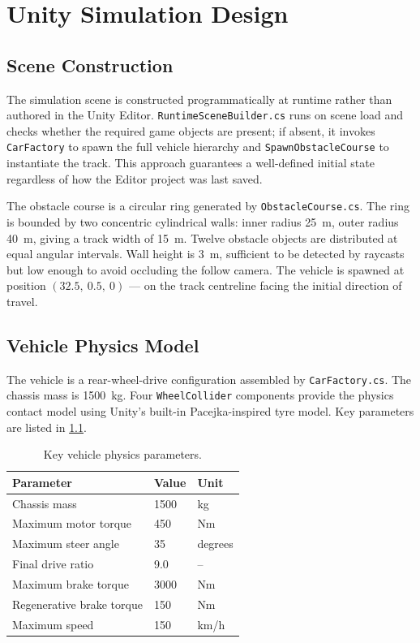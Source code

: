 \chapter{Unity Simulation Design}\label{ch:unity}
\thispagestyle{pagestyle}

\section{Scene Construction}
\label{sec:scene}

The simulation scene is constructed programmatically at runtime rather
than authored in the Unity Editor. \texttt{RuntimeSceneBuilder.cs} runs
on scene load and checks whether the required game objects are present;
if absent, it invokes \texttt{CarFactory} to spawn the full vehicle
hierarchy and \texttt{SpawnObstacleCourse} to instantiate the track. This
approach guarantees a well-defined initial state regardless of how the
Editor project was last saved.

The obstacle course is a circular ring generated by
\texttt{ObstacleCourse.cs}. The ring is bounded by two concentric
cylindrical walls: inner radius 25~m, outer radius 40~m, giving a track
width of 15~m. Twelve obstacle objects are distributed at equal angular
intervals. Wall height is 3~m, sufficient to be detected by raycasts but
low enough to avoid occluding the follow camera. The vehicle is spawned
at position $(32.5,\ 0.5,\ 0)$ --- on the track centreline facing the
initial direction of travel.

\section{Vehicle Physics Model}
\label{sec:vehicle-physics}

The vehicle is a rear-wheel-drive configuration assembled by
\texttt{CarFactory.cs}. The chassis mass is 1500~kg. Four
\texttt{WheelCollider} components provide the physics contact model using
Unity's \cite{UnityManual2022} built-in Pacejka-inspired tyre model.
Key parameters are listed in \cref{table:vehicle-params}.

\begin{table}[H]
\caption{Key vehicle physics parameters.}
\label{table:vehicle-params}
\begin{tabular}{|p{5cm}|p{2.5cm}|p{2cm}|}
  \hline
  \textbf{Parameter} & \textbf{Value} & \textbf{Unit} \\
  \hline
  Chassis mass           & 1500   & kg \\
  \hline
  Maximum motor torque   & 450    & Nm \\
  \hline
  Maximum steer angle    & 35     & degrees \\
  \hline
  Final drive ratio      & 9.0    & -- \\
  \hline
  Maximum brake torque   & 3000   & Nm \\
  \hline
  Regenerative brake torque & 150 & Nm \\
  \hline
  Maximum speed          & 150    & km/h \\
  \hline
\end{tabular}
\end{table}

